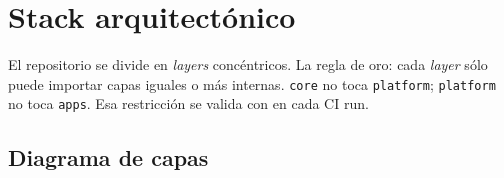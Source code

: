 \chapter{Stack arquitectónico}
\label{cap:stack}

\begin{intuicion}
El repositorio se divide en \emph{layers} concéntricos. La regla de
oro: cada \emph{layer} sólo puede importar capas iguales o más
internas. \texttt{core} no toca \texttt{platform}; \texttt{platform}
no toca \texttt{apps}. Esa restricción se valida con
 en cada CI run.
\end{intuicion}

\section{Diagrama de capas}

